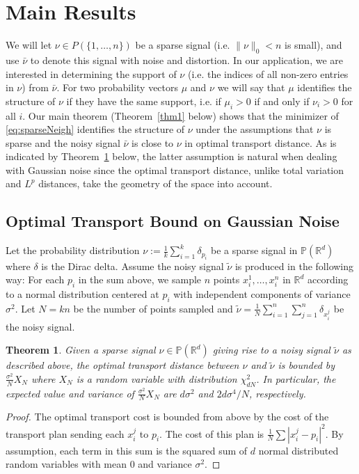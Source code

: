 \documentclass[conference]{IEEEtran}
\newcommand{\R}{{\mathbb{R}}}
\newcommand{\bbP}{{\mathbb{P}}}
\newtheorem{theorem}{Theorem}
\begin{document}
\section{Main Results}\label{sec:MainResults}
We will let $\nu\in P(\{1,\ldots,n\})$ be a sparse signal (i.e. $\|\nu\|_0<n$ is small), and use $\bar\nu$ to denote this signal with noise and distortion. In our application, we are interested in determining the support of $\nu$ (i.e. the indices of all non-zero entries in $\nu$) from $\bar\nu$. For two probability vectors $\mu$ and $\nu$ we will say that $\mu$ identifies the structure of $\nu$ if they have the same support, i.e. if $\mu_i>0$ if and only if $\nu_i>0$ for all $i$. Our main theorem (Theorem~\ref{thm1} below) shows that the minimizer of \eqref{eq:sparseNeigh} identifies the structure of $\nu$ under the assumptions that $\nu$ is sparse and the noisy signal $\bar\nu$ is close to $\nu$ in optimal transport distance. As is indicated by Theorem~\ref{thm:NoiseBound} below, the latter assumption is natural when dealing with Gaussian noise since the optimal transport distance, unlike total variation and $L^p$ distances, take the geometry of the space into account. 

\subsection{Optimal Transport Bound on Gaussian Noise}
Let the probability distribution $\nu:=\frac{1}{k}\sum_{i=1}^k \delta_{p_i}$ be a sparse signal in $\bbP(\R^d)$ where $\delta$ is the Dirac delta. Assume the noisy signal $\tilde\nu$ is produced in the following way: For each $p_i$ in the sum above, we sample $n$ points $x_i^1,\ldots,x_i^n$ in $\R^d$ according to a normal distribution centered at $p_i$ with independent components of variance $\sigma^2$. Let $N=kn$ be the number of points sampled and $\tilde\nu=\frac{1}{N}\sum_{i=1}^n \sum_{j=1}^n\delta_{x_i^j}$ be the noisy signal. 
\begin{theorem}
\label{thm:NoiseBound}
    Given a sparse signal $\nu\in\bbP(\R^d)$ giving rise to a noisy signal $\tilde\nu$ as described above, the optimal transport distance between $\nu$ and $\tilde\nu$ is bounded by $\frac{\sigma^2}{N}X_N$ where $X_N$ is a random variable with distribution $\chi^2_{dN}$. In particular, the expected value and variance of $\frac{\sigma^2}{N}X_N$ are $d\sigma^2$ and $2d\sigma^4/N$, respectively. 
\end{theorem}
\begin{proof}
    The optimal transport cost is bounded from above by the cost of the transport plan sending each $x_i^j$ to $p_i$. The cost of this plan is 
    $\frac{1}{N}\sum |x_i^j-p_i|^2 $. By assumption, each term in this sum is the squared sum of $d$ normal distributed random variables with mean 0 and variance $\sigma^2$. 
\end{proof}
\end{document}
